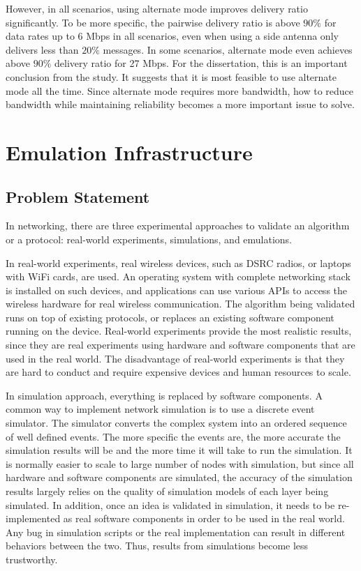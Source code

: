 \documentclass[12pt]{report}
\begin{document}
However, in all scenarios, using alternate mode improves delivery ratio significantly. To be more specific, the pairwise delivery ratio is above $90\%$ for data rates up to 6 Mbps in all scenarios, even when using a side antenna only delivers less than $20\%$ messages. In some scenarios, alternate mode even achieves above $90\%$ delivery ratio for 27 Mbps. \cite{songDSRC2016} For the dissertation, this is an important conclusion from the study. It suggests that it is most feasible to use alternate mode all the time. Since alternate mode requires more bandwidth, how to reduce bandwidth while maintaining reliability becomes a more important issue to solve.

\chapter{Emulation Infrastructure}

\section{Problem Statement}
\label{sec:problem_validation}

In networking, there are three experimental approaches to validate an algorithm or a protocol: real-world experiments, simulations, and emulations.

In real-world experiments, real wireless devices, such as DSRC radios, or laptops with WiFi cards, are used. An operating system with complete networking stack is installed on such devices, and applications can use various APIs to access the wireless hardware for real wireless communication. The algorithm being validated runs on top of existing protocols, or replaces an existing software component running on the device. Real-world experiments provide the most realistic results, since they are real experiments using hardware and software components that are used in the real world. The disadvantage of real-world experiments is that they are hard to conduct and require expensive devices and human resources to scale.

In simulation approach, everything is replaced by software components. A common way to implement network simulation is to use a discrete event simulator. The simulator converts the complex system into an ordered sequence of well defined events. The more specific the events are, the more accurate the simulation results will be and the more time it will take to run the simulation. It is normally easier to scale to large number of nodes with simulation, but since all hardware and software components are simulated, the accuracy of the simulation results largely relies on the quality of simulation models of each layer being simulated. In addition, once an idea is validated in simulation, it needs to be re-implemented as real software components in order to be used in the real world. Any bug in simulation scripts or the real implementation can result in different behaviors between the two. Thus, results from simulations become less trustworthy.
\end{document}
